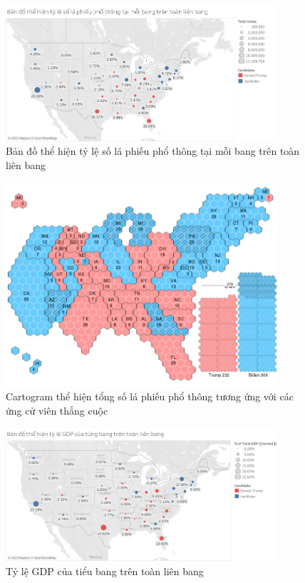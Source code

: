 \documentclass[14pt, a4paper]{article}
\numberwithin{equation}{section}
\numberwithin{figure}{section}
\numberwithin{dl}{section}
\numberwithin{md}{section}
\numberwithin{bd}{section}
\numberwithin{dn}{section}
\numberwithin{hq}{section}
\begin{document}
    \begin{figure}[h!]
        \centering
        \includegraphics[width=0.9\textwidth]{State_Percentage_Vote_Circle.png}
        \caption{Bản đồ thể hiện tỷ lệ số lá phiếu phổ thông tại mỗi bang trên toàn liên bang}
    \end{figure}

    \begin{figure}[h!]
        \centering
        \includegraphics[width=0.9\textwidth]{State_Total_Vote_Cartogram.png}
        \caption{Cartogram thể hiện tổng số lá phiếu phổ thông tương ứng với các ứng cử viên thắng cuộc}
    \end{figure}

    \begin{figure}[h!]
        \centering
        \includegraphics[width=0.9\textwidth]{figures/State_Percentage_GDP_Circle.png}
        \caption{Tỷ lệ GDP của tiểu bang trên toàn liên bang}
    \end{figure}
\end{document}
